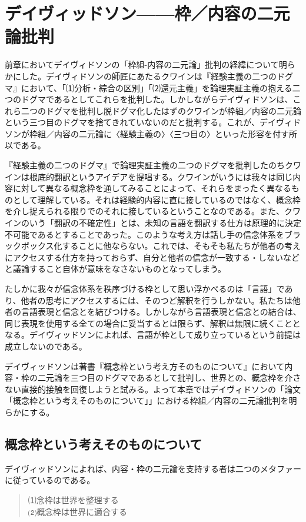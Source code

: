 \documentclass[b5j,twoside,twocolumn]{utarticle}
\begin{document}
\section{\tbaselineshift =4.0pt デイヴィッドソン------枠／内容の二元論批判}
前章においてデイヴィドソンの「枠組-内容の二元論」批判の経緯について明らかにした。デイヴィドソンの師匠にあたるクワインは『経験主義の二つのドグマ』において、「⑴分析・綜合の区別」「⑵還元主義」を論理実証主義の抱える二つのドグマであるとしてこれらを批判した。しかしながらデイヴィドソンは、これら二つのドグマを批判し脱ドグマ化したはずのクワインが枠組／内容の二元論という三つ目のドグマを捨てきれていないのだと批判する。これが、デイヴィドソンが枠組／内容の二元論に〈経験主義の〉〈三つ目の〉といった形容を付す所以である。



『経験主義の二つのドグマ』で論理実証主義の二つのドグマを批判したのちクワインは根底的翻訳というアイデアを提唱する。クワインがいうには我々は同じ内容に対して異なる概念枠を通してみることによって、それらをまったく異なるものとして理解している。それは経験的内容に直に接しているのではなく、概念枠を介し捉えられる限りでのそれに接しているということなのである。また、クワインのいう「翻訳の不確定性」とは、未知の言語を翻訳する仕方は原理的に決定不可能であるとすることであった。このような考え方は話し手の信念体系をブラックボックス化することに他ならない。これでは、そもそも私たちが他者の考えにアクセスする仕方を持っておらず、自分と他者の信念が一致する・しないなどと議論すること自体が意味をなさないものとなってしまう。


たしかに我々が信念体系を秩序づける枠として思い浮かべるのは「言語」であり、他者の思考にアクセスするには、そのつど解釈を行うしかない。私たちは他者の言語表現と信念とを結びつける。しかしながら言語表現と信念との結合は、同じ表現を使用する全ての場合に妥当するとは限らず、解釈は無限に続くこととなる。デイヴィッドソンによれば、言語が枠として成り立っているという前提は成立しないのである。


デイヴィッドソンは著書『概念枠という考え方そのものについて』において内容・枠の二元論を三つ目のドグマであるとして批判し、世界との、概念枠を介さない直接的接触を回復しようと試みる。よって本章ではデイヴィドソンの「論文「概念枠という考えそのものについて」」における枠組／内容の二元論批判を明らかにする。
\subsection{概念枠という考えそのものについて}
デイヴィッドソンによれば、内容・枠の二元論を支持する者は二つのメタファーに従っているのである。
\begin{quote}
⑴念枠は世界を整理する\\
⑵概念枠は世界に適合する
\end{quote}
\end{document}
